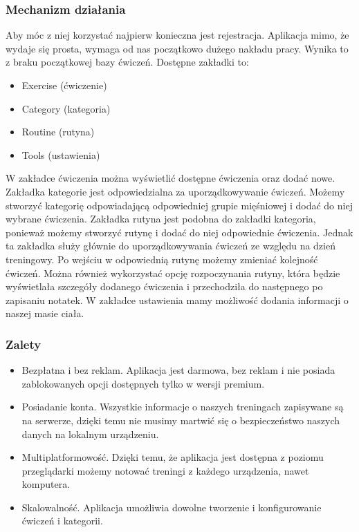 \documentclass{article}
\begin{document}
            \subsubsection*{Mechanizm działania}
            Aby móc z niej korzystać najpierw konieczna jest rejestracja. Aplikacja mimo, że wydaje się prosta, wymaga od nas początkowo dużego nakładu pracy. Wynika to z braku początkowej bazy ćwiczeń. Dostępne zakładki to:
            \begin{itemize}
                  \item Exercise (ćwiczenie)
                  \item Category (kategoria)
                  \item Routine (rutyna)
                  \item Tools (ustawienia)
            \end{itemize}
            W zakładce ćwiczenia można wyświetlić dostępne ćwiczenia oraz dodać nowe. Zakładka kategorie jest odpowiedzialna za uporządkowywanie ćwiczeń. Możemy stworzyć kategorię odpowiadającą odpowiedniej grupie mięśniowej i dodać do niej wybrane ćwiczenia. Zakładka rutyna jest podobna do zakładki kategoria, ponieważ możemy stworzyć rutynę i dodać do niej odpowiednie ćwiczenia. Jednak ta zakładka służy głównie do uporządkowywania ćwiczeń ze względu na dzień treningowy. Po wejściu w odpowiednią rutynę możemy zmieniać kolejność ćwiczeń. Można również wykorzystać opcję rozpoczynania rutyny, która będzie wyświetlała szczegóły dodanego ćwiczenia i przechodziła do następnego po zapisaniu notatek. W zakładce ustawienia mamy możliwość dodania informacji o naszej masie ciała.
            \subsubsection*{Zalety}
            \begin{itemize}
                  \item Bezpłatna i bez reklam. Aplikacja jest darmowa, bez reklam i nie posiada zablokowanych opcji dostępnych tylko w wersji premium.
                  \item Posiadanie konta. Wszystkie informacje o naszych treningach zapisywane są na serwerze, dzięki temu nie musimy martwić się o bezpieczeństwo naszych danych na lokalnym urządzeniu.
                  \item Multiplatformowość. Dzięki temu, że aplikacja jest dostępna z poziomu przeglądarki możemy notować treningi z każdego urządzenia, nawet komputera.
                  \item Skalowalność. Aplikacja umożliwia dowolne tworzenie i konfigurowanie ćwiczeń i kategorii.
            \end{itemize}
\end{document}
